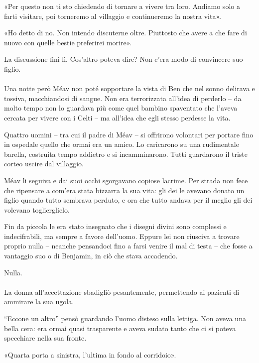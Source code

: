 \documentclass[a4paper,12pt]{book}
\begin{document}
«Per questo non ti sto chiedendo di tornare a vivere tra loro. Andiamo solo a
farti visitare, poi torneremo al villaggio e continueremo la nostra vita».

«Ho detto di no. Non intendo discuterne oltre. Piuttosto che avere a che fare
di nuovo con quelle bestie preferirei morire».

La discussione finì lì. Cos'altro poteva dire? Non c'era modo di convincere
suo figlio.

\paragraph{}
Una notte però Méav non poté sopportare la vista di Ben che nel sonno
delirava e tossiva, macchiandosi di sangue. Non era terrorizzata all'idea di
perderlo -- da molto tempo non lo guardava più come quel bambino spaventato
che l'aveva cercata per vivere con i Celti -- ma all'idea che egli stesso
perdesse la vita.

Quattro uomini -- tra cui il padre di Méav -- si offrirono volontari per
portare fino in ospedale quello che ormai era un amico. Lo caricarono su una
rudimentale barella, costruita tempo addietro e si incamminarono. Tutti
guardarono il triste corteo uscire dal villaggio.

Méav li seguiva e dai suoi occhi sgorgavano copiose lacrime. Per strada non
fece che ripensare a com'era stata bizzarra la sua vita: gli dei le avevano
donato un figlio quando tutto sembrava perduto, e ora che tutto andava per il
meglio gli dei volevano toglierglielo.

Fin da piccola le era stato insegnato che i disegni divini sono complessi e
indecifrabili, ma sempre a favore dell'uomo. Eppure lei non riusciva a trovare
proprio nulla -- neanche pensandoci fino a farsi venire il mal di testa -- che
fosse a vantaggio suo o di Benjamin, in ciò che stava accadendo.

Nulla.

\paragraph{}
La donna all'accettazione sbadigliò pesantemente, permettendo ai pazienti di
ammirare la sua ugola.

``Eccone un altro'' pensò guardando l'uomo disteso sulla lettiga. Non aveva
una bella cera: era ormai quasi trasparente e aveva sudato tanto che ci si
poteva specchiare nella sua fronte.

«Quarta porta a sinistra, l'ultima in fondo al corridoio».
\end{document}
